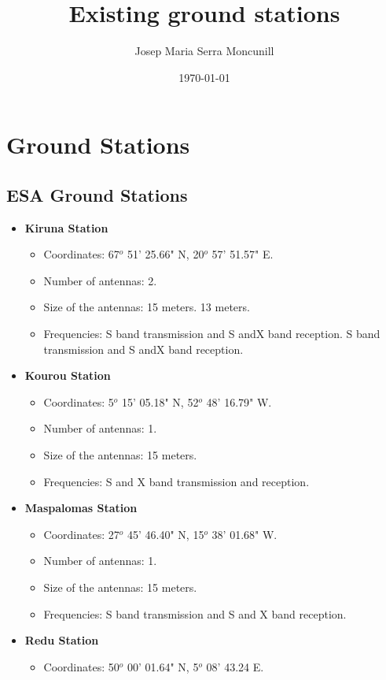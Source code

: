 \documentclass[12pt,a4paper]{report}
\author{Josep Maria Serra Moncunill}
\title{Existing ground stations}
\date{\today}
\begin{document}
\maketitle
\tableofcontents
\listoffigures
\listoftables

\section{Ground Stations}

\subsection{ESA Ground Stations}

\begin{itemize}
\item \textbf{Kiruna Station}
\begin{itemize}
\item Coordinates: 67$^{o}$ 51' 25.66" N, 20$^{o}$ 57' 51.57" E.
\item Number of antennas: 2.
\item Size of the antennas: 15 meters. 13 meters.
\item Frequencies: S band transmission and S andX band reception. S band transmission and S andX band reception.
\end{itemize}
\item \textbf{Kourou Station}
\begin{itemize}
\item Coordinates: 5$^{o}$ 15' 05.18" N, 52$^{o}$ 48' 16.79" W.
\item Number of antennas: 1.
\item Size of the antennas: 15 meters.
\item Frequencies: S and X band transmission and reception.
\end{itemize}
\item \textbf{Maspalomas Station}
\begin{itemize}
\item Coordinates: 27$^{o}$ 45' 46.40" N, 15$^{o}$ 38' 01.68" W.
\item Number of antennas: 1.
\item Size of the antennas: 15 meters.
\item Frequencies: S band transmission and S and X band reception.
\end{itemize}
\item \textbf{Redu Station}
\begin{itemize}
\item Coordinates: 50$^{o}$ 00' 01.64" N, 5$^{o}$ 08' 43.24 E.

\end{itemize}
\end{itemize}
\end{document}

